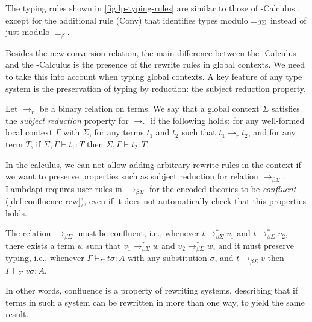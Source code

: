 \begin{remark}
The typing rules shown in \cref{fig:lp-typing-rules} are similar to those of  \lp{}-Calculus \cite[\S 2]{lf}, except for the additional rule (Conv) that identifies types modulo $\equiv_{\beta\Sigma}$ instead of just modulo $\equiv_\beta$.
\end{remark}

Besides the new conversion relation, the main difference between the \lp-Calculus and the \lpm-Calculus is the presence of the rewrite rules
in global contexts. We need to take this into account when typing global contexts. A key feature of any type system is the preservation of typing by reduction: the
subject reduction property.

\begin{definition}
Let $\longrightarrow_r$ be a binary relation on terms.
We say that a global context $\Sigma$ satisfies the \emph{subject reduction} property for $\longrightarrow_r$ if the following holds:
for any well-formed local context $\Gamma$ with $\Sigma$, for any terms $t_1$ and $t_2$ such that $t_1 \longrightarrow_r t_2$, and for any term $T$,
if $\Sigma, \Gamma \vdash t_1 : T$ then $\Sigma, \Gamma \vdash t_2 : T$.
\end{definition}

In the \lpm calculus, we can not allow adding arbitrary rewrite rules in the context if
we want to preserve properties such as subject reduction for relation $\longrightarrow_{\beta\Sigma}$.
Lambdapi requires user rules in $\longrightarrow_{\beta\Sigma}$ for the encoded theories to be \emph{confluent} (\cref{def:confluence-rew}),
even if it does not automatically check that this properties holds.

\begin{definition}\label{def:confluence-rew}
The relation $\longrightarrow_{\beta\Sigma}$ must be confluent, i.e., whenever $t \longrightarrow_{\beta\Sigma}^* v_1$ and $t \longrightarrow_{\beta\Sigma}^* v_2$, there exists a term $w$ such that $v_1 \longrightarrow_{\beta\Sigma}^* w$ and $v_2 \longrightarrow_{\beta\Sigma}^* w$, and it must preserve typing, i.e.,
whenever $\Gamma \vdash_\Sigma t\sigma: A$ with any substitution $\sigma$, and $t \longrightarrow_{\beta\Sigma} v$ then $\Gamma \vdash_\Sigma v\sigma: A$.
\end{definition}

In other words, confluence is a property of rewriting systems, describing that if terms in such a system can be rewritten in more than one way, to yield the same result.

